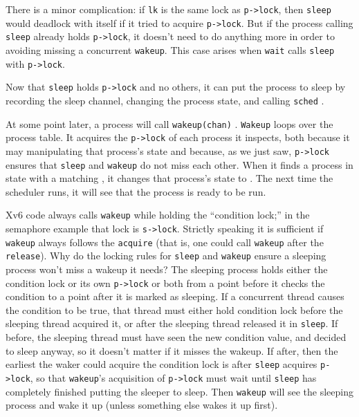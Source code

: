 There is a minor complication: if 
\lstinline{lk}
is the same lock as
\lstinline{p->lock},
then
\lstinline{sleep}
would deadlock with itself if it tried to acquire 
\lstinline{p->lock}.
But if the process calling
\lstinline{sleep}
already holds \lstinline{p->lock}, it
doesn't need to do anything more in order
to avoiding missing a concurrent \lstinline{wakeup}.
This case arises when
\lstinline{wait}
calls
\lstinline{sleep}
with 
\lstinline{p->lock}.

Now that
\lstinline{sleep}
holds
\lstinline{p->lock}
and no others,
it can put the process to sleep by recording
the sleep channel,
changing the process state,
and calling
\lstinline{sched}
.

At some point later, a process will call
\lstinline{wakeup(chan)}
.
\lstinline{Wakeup}
loops over the process table.
It acquires the
\lstinline{p->lock}
of each process it inspects,
both because it may manipulating that process's state
and because, as we just saw,
\lstinline{p->lock}
ensures that
\lstinline{sleep}
and
\lstinline{wakeup}
do not miss each other.
When it finds a process in state
with a matching
,
it changes that process's state to
.
The next time the scheduler runs, it will
see that the process is ready to be run.

Xv6 code always calls
\lstinline{wakeup}
while holding the ``condition lock;''
in the semaphore example that lock is
\lstinline{s->lock}.
Strictly speaking it is sufficient if
\lstinline{wakeup}
always follows the
\lstinline{acquire}
(that is, one could call
\lstinline{wakeup}
after the
\lstinline{release}).
Why do the locking rules for 
\lstinline{sleep}
and
\lstinline{wakeup}
ensure a sleeping process won't miss a wakeup it needs?
The sleeping process holds either
the condition lock or its own
\lstinline{p->lock} 
or both from a point before it checks the condition
to a point after it is marked as sleeping.
If a concurrent thread causes the condition to be true,
that thread must either hold condition lock before the
sleeping thread acquired it, or after the sleeping
thread released it in
\lstinline{sleep}.
If before, the sleeping thread must have seen the new condition
value, and decided to sleep anyway, so it doesn't matter
if it misses the wakeup.
If after, then the earliest the waker could acquire the
condition lock is after
\lstinline{sleep}
acquires
\lstinline{p->lock},
so that
\lstinline{wakeup}'s
acquisition of
\lstinline{p->lock}
must wait until
\lstinline{sleep}
has completely finished putting the sleeper to sleep.
Then 
\lstinline{wakeup}
will see the sleeping process and wake it up
(unless something else wakes it up first).

